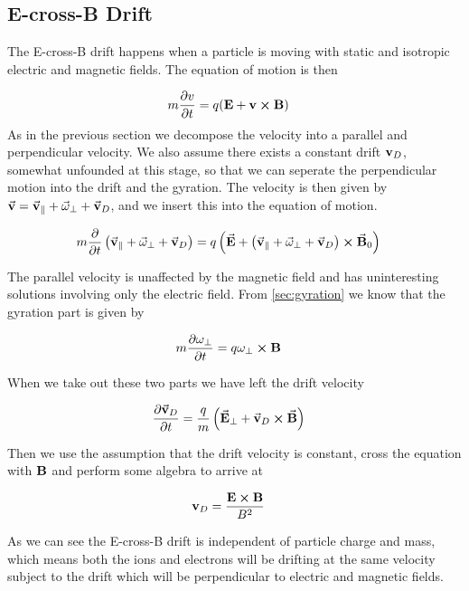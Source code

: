 	\subsection{E-cross-B Drift}
	The E-cross-B drift happens when a particle is moving with static and isotropic
	electric and magnetic fields. The equation of motion is then

	\begin{align}
		m\pdv{v}{t} &= q(\vb{E} + \vb{v}\cross\vb{B}) \label{eq:EcrossB}
	\end{align}
	As in the previous section we decompose the velocity into a parallel and perpendicular
 	velocity. We also assume there exists a constant drift \(\vb{v}_D\), somewhat unfounded at this stage,
	so that we can seperate the perpendicular motion into the drift and the gyration.
	The velocity is then given by \(\va{v} = \va{v}_\parallel + \va{\omega}_\perp + \va{v}_D\),
	and we insert this into the equation of motion.

	\begin{align}
		m\pdv{}{t}\left( \va{v}_\parallel + \va{\omega}_\perp + \va{v}_D\right) &=
		q \left( \va{E} +   \left( \va{v}_\parallel + \va{\omega}_\perp +
		\va{v}_D \right)  \cross \va{B}_0 \right)
	\end{align}


	The parallel velocity is unaffected by the magnetic field and has uninteresting
	solutions involving only the electric field. From \cref{sec:gyration} we know that the gyration
	part is given by

	\begin{align}
		m\pdv{\vb{\omega}_\perp}{t} &= q\vb{\vb{\omega}_\perp}\cross\vb{B}
	\end{align}

	When we take out these two parts we have left the drift velocity

	\begin{align}
		\pdv{\va{v}_D}{t} &= \frac{q}{m} \left( \va{E}_\perp + \va{v}_D \cross \va{B} \right)
	\end{align}

	Then we use the assumption that the drift velocity is constant, cross the equation
 	with \(\vb{B}\) and perform some algebra to arrive at

	\begin{align}
		\vb{v}_D &= \frac{\vb{E}\cross\vb{B}}{B^2}
	\end{align}

	As we can see the E-cross-B drift is independent of particle charge and mass,
	which means both the ions and electrons will be drifting at the same velocity
	subject to the drift which will be perpendicular to electric and magnetic fields.
